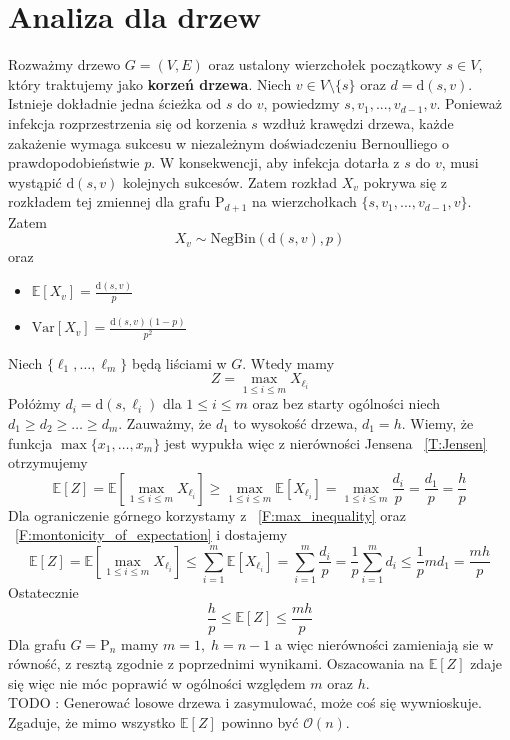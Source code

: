 \section{Analiza dla drzew}

Rozważmy drzewo $G = (V, E)$ oraz ustalony wierzchołek początkowy $s \in V$, 
który traktujemy jako \textbf{korzeń drzewa}. Niech $v\in V\setminus\{s\}$ oraz $d=\mathrm{d}(s,v)$. Istnieje dokładnie jedna ścieżka od $s$ do $v$, powiedzmy $s,v_1,...,v_{d-1}, v$. Ponieważ infekcja rozprzestrzenia się od korzenia $s$ wzdłuż krawędzi drzewa, 
każde zakażenie wymaga sukcesu w niezależnym doświadczeniu Bernoulliego o prawdopodobieństwie $p$.
W konsekwencji, aby infekcja dotarła z $s$ do $v$, 
musi wystąpić $\mathrm{d}(s,v)$ kolejnych sukcesów. Zatem rozkład $X_v$ pokrywa się z rozkładem tej zmiennej dla grafu $\mathrm{P}_{d+1}$ na wierzchołkach $\{s,v_1,...,v_{d-1}, v\}$. 
Zatem 
\[
    X_v\sim \mathrm{NegBin}(\mathrm{d}(s,v),p)
\]
oraz
\begin{itemize}
    \item $\mathbb{E}[X_v] = \frac{\mathrm{d}(s,v)}{p}$
    \item $\mathrm{Var}[X_v] = \frac{\mathrm{d}(s,v)(1 - p)}{p^2}$
\end{itemize}
Niech $\{\ell_1,\dots, \ell_m\}$ będą liściami w $G$. Wtedy mamy 
\[
    Z = \max_{1\le i \le m} X_{\ell _i}
\] 
Połóżmy $d_i=\mathrm{d}(s,\ell_i)$ dla $1\le i \le m$ oraz bez starty ogólności niech $d_1\ge d_2\ge\dots\ge d_m$. Zauważmy, że $d_1$ to wysokość drzewa, $d_1=h$.
Wiemy, że funkcja $\max\{x_1,\dots, x_m\}$ jest wypukła więc z nierówności Jensena ~\ref{T:Jensen} otrzymujemy
\[
    \mathbb{E}[Z]=\mathbb{E}[\max_{1\le i \le m} X_{\ell _i}] \ge \max_{1\le i \le m} \mathbb{E}[X_{\ell _i}] = \max_{1\le i \le m} \frac{d_i}{p} = \frac{d_1}{p} = \frac{h}{p}
\]
Dla ograniczenie górnego korzystamy z ~\ref{F:max_inequality} oraz ~\ref{F:montonicity_of_expectation} i dostajemy
\[
    \mathbb{E}[Z]=\mathbb{E}[\max_{1\le i \le m} X_{\ell _i}] \le \sum_{i=1}^{m}\mathbb{E}[X_{\ell _i}] = \sum_{i=1}^{m} \frac{d_i}{p} = \frac{1}{p} \sum_{i=1}^{m} d_i \le \frac{1}{p} md_1=\frac{mh}{p}
\]
Ostatecznie 
\[
  \frac{h}{p} \le \mathbb{E}[Z] \le \frac{mh}{p} 
\]
Dla grafu $G=\mathrm{P}_n$ mamy $m=1, \; h=n-1$ a więc nierówności zamieniają sie w równość, z resztą zgodnie z poprzednimi wynikami. Oszacowania na $\mathbb{E}[Z]$ zdaje się więc nie móc poprawić w ogólności względem $m$ oraz $h$. \\
TODO : Generować losowe drzewa i zasymulować, może coś się wywnioskuje. Zgaduje, że mimo wszystko $\mathbb{E}[Z]$ powinno być $\mathcal{O}(n)$.
